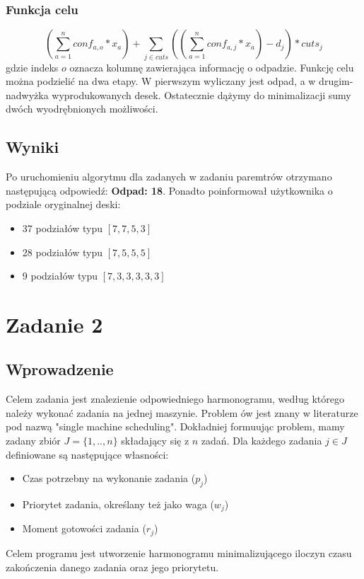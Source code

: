 \documentclass[a4paper,14pt]{report}
\begin{document}
    \subsection{Funkcja celu}
        \begin{equation}
            (\sum_{a=1}^{n} conf_{a,o} * x_{a} ) +  \sum_{j \in cuts} ( (\sum_{a=1}^{n} conf_{a,j} * x_{a} ) - d_j ) * cuts_j 
        \end{equation}
        gdzie indeks $o$ oznacza kolumnę zawierająca informację o odpadzie.
        Funkcję celu można podzielić na dwa etapy. W pierwszym wyliczany jest odpad, a w drugim- nadwyżka wyprodukowanych desek. Ostatecznie 
        dążymy do minimalizacji sumy dwóch wyodrębnionych możliwości.
\section{Wyniki} 
    Po uruchomieniu algorytmu dla zadanych w zadaniu paremtrów otrzymano następującą odpowiedź: \textbf{Odpad: 18}. Ponadto poinformował użytkownika
    o podziale oryginalnej deski:
    \begin{itemize}
        \item 37 podziałów typu $[7,7,5,3]$
        \item 28 podziałów typu $[7,5,5,5]$
        \item 9 podziałów typu $[7,3,3,3,3,3]$
    \end{itemize}
\chapter{Zadanie 2}
\section{Wprowadzenie}
    Celem zadania jest znalezienie odpowiedniego harmonogramu, według którego należy 
    wykonać zadania na jednej maszynie. Problem ów jest znany w literaturze pod nazwą 
    "single machine scheduling". Dokładniej formuując problem, mamy zadany zbiór
    $J = \{1,..,n\}$ składający się z $n$ zadań. Dla każdego zadania $j \in J $ definiowane są następujące własności:
    \begin{itemize}
        \item Czas potrzebny na wykonanie zadania ($p_{j}$)
        \item Priorytet zadania, określany też jako waga ($w_{j}$)
        \item Moment gotowości zadania ($r_{j}$)
    \end{itemize}
    Celem programu jest utworzenie harmonogramu minimalizującego iloczyn czasu zakończenia 
    danego zadania oraz jego priorytetu.
\end{document}
